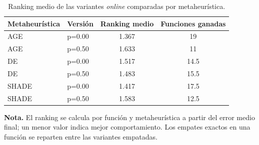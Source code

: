 \begin{table}[H]
\centering
\caption{Ranking medio de las variantes \textit{online} comparadas por metaheurística.}
\label{tab:online_ranking_medio}
\begin{tabular}{llcc}
\toprule
\textbf{Metaheurística} & \textbf{Versión} & \textbf{Ranking medio} & \textbf{Funciones ganadas} \\
\midrule
AGE & p=0.00 & 1.367 & 19 \\
AGE & p=0.50 & 1.633 & 11 \\
DE & p=0.00 & 1.517 & 14.5 \\
DE & p=0.50 & 1.483 & 15.5 \\
SHADE & p=0.00 & 1.417 & 17.5 \\
SHADE & p=0.50 & 1.583 & 12.5 \\
\bottomrule
\end{tabular}
\vspace{2pt}
\begin{flushleft}\small
\textbf{Nota.} El ranking se calcula por función y metaheurística a partir del error medio final; un menor valor indica mejor comportamiento. Los empates exactos en una función se reparten entre las variantes empatadas.
\end{flushleft}
\end{table}
